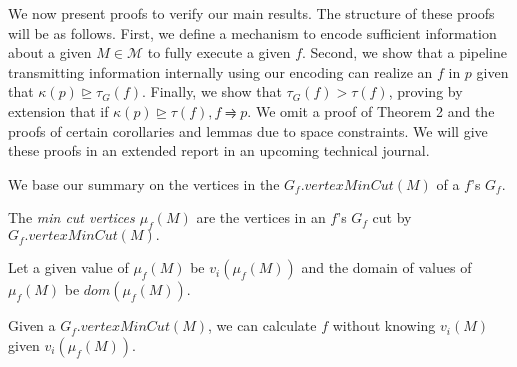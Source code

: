 We now present proofs to verify our main results. The structure of these proofs will be as follows. First, we define a mechanism to encode sufficient information about a given $M \in \mathcal{M}$ to fully execute a given $f$. Second, we show that a pipeline transmitting information internally using our encoding can realize an $f$ in $p$ given that $\kappa(p) \trianglerighteq \tau_G(f)$. Finally, we show that $\tau_G(f) > \tau(f)$, proving by extension that if $\kappa(p) \trianglerighteq \tau(f), f \rightrightharpoons p$. We omit a proof of Theorem 2 and the proofs of certain corollaries and lemmas due to space constraints. We will give these proofs in an extended report in an upcoming technical journal.

We base our summary on the vertices in the $G_f.vertexMinCut(M)$ of a $f$'s $G_f$. %

\begin{definition}
The {\em min cut vertices $\mu_f(M)$} are the vertices in an $f$'s $G_f$ cut by $G_f.vertexMinCut(M).$ 
\end{definition}

Let a given value of $\mu_f(M)$ be $v_i(\mu_f(M))$ and the domain of values of $\mu_f(M)$ be $dom(\mu_f(M))$. %

\begin{lemma}
\label{lemma:M-to-mu}
Given a $G_f.vertexMinCut(M)$, we can calculate $f$ without knowing $v_i(M)$ given $v_i(\mu_f(M))$.
\end{lemma}




